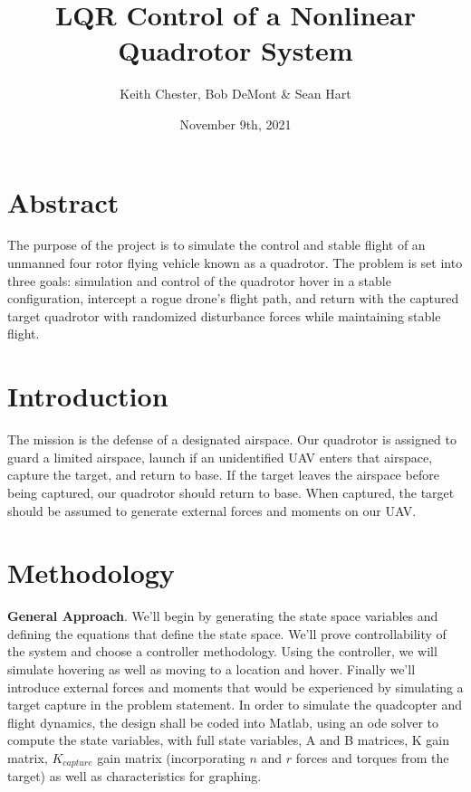 \documentclass{article}
\title{LQR Control of a Nonlinear Quadrotor System}
\author{Keith Chester, Bob DeMont & Sean Hart}
\date{November 9th, 2021}
\begin{document}
\maketitle

\begin{multicols}{2}
\section*{Abstract}
The purpose of the project is to simulate the control and stable flight of an unmanned four rotor flying vehicle known as a quadrotor.  The problem is set into three goals: simulation and control of the quadrotor hover in a stable configuration, intercept a rogue drone's flight path, and return with the captured target quadrotor with randomized disturbance forces while maintaining stable flight.

\section*{Introduction}
The mission is the defense of a designated airspace.  Our quadrotor is assigned to guard a limited airspace, launch if an unidentified 
UAV enters that airspace, capture the target, and return to base.  If the target leaves the airspace before being captured, our 
quadrotor should return to base.  When captured, the target should be assumed to generate external forces and moments on our UAV.  
\section*{Methodology}
\textbf{General Approach}. We'll begin by generating the state space variables and defining the equations that define the state space.  We'll prove 
controllability of the system and choose a controller methodology.  Using the controller, we will simulate hovering as well as moving to a 
location and hover.  Finally we'll introduce external forces and moments that would be experienced by simulating a target capture in the 
problem statement.  In order to simulate the quadcopter and flight dynamics, the design shall be coded into Matlab, using an ode solver to compute the state variables, with full state variables, A and B matrices, K gain matrix, $K_{capture}$ gain matrix (incorporating $n$ and $r$ forces and torques from the target) 
as well as characteristics for graphing.\\


\end{multicols}
\end{document}
